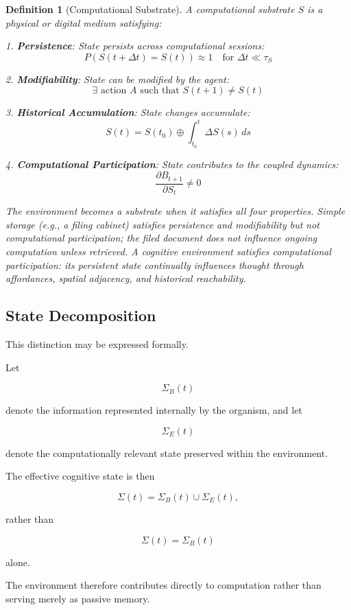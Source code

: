 \documentclass[12pt,oneside]{article}
\newtheorem{definition}{Definition}[section]
\theoremstyle{remark}
\begin{document}
\begin{definition}[Computational Substrate]
A computational substrate \(S\) is a physical or digital medium satisfying:

1. \textbf{Persistence}: State persists across computational sessions:
   \[
   P(S(t + \Delta t) = S(t)) \approx 1 \quad \text{for } \Delta t \ll \tau_S
   \]

2. \textbf{Modifiability}: State can be modified by the agent:
   \[
   \exists \text{ action } A \text{ such that } S(t+1) \neq S(t)
   \]

3. \textbf{Historical Accumulation}: State changes accumulate:
   \[
   S(t) = S(t_0) \oplus \int_{t_0}^{t} \Delta S(s) \, ds
   \]

4. \textbf{Computational Participation}: State contributes to the coupled dynamics:
   \[
   \frac{\partial B_{t+1}}{\partial S_t} \neq 0
   \]

The environment becomes a substrate when it satisfies all four properties. Simple storage (e.g., a filing cabinet) satisfies persistence and modifiability but not computational participation; the filed document does not influence ongoing computation unless retrieved. A cognitive environment satisfies computational participation: its persistent state continually influences thought through affordances, spatial adjacency, and historical reachability.
\end{definition}

\subsection{State Decomposition}

This distinction may be expressed formally.

Let

\[
\Sigma_B(t)
\]

denote the information represented internally by the organism, and let

\[
\Sigma_E(t)
\]

denote the computationally relevant state preserved within the environment.

The effective cognitive state is then

\[
\Sigma(t) = \Sigma_B(t) \cup \Sigma_E(t),
\]

rather than

\[
\Sigma(t) = \Sigma_B(t)
\]

alone.

The environment therefore contributes directly to computation rather than serving merely as passive memory.
\end{document}
